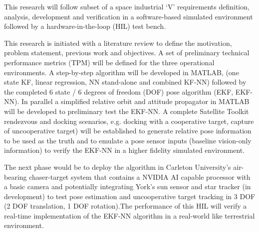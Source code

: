 This research will follow subset of a space industrial ‘V’ requirements definition, analysis, development and verification in a software-based simulated environment followed by a hardware-in-the-loop (HIL) test bench. 

This research is initiated with a literature review to define the motivation, problem statement, previous work and objectives. A set of preliminary technical performance metrics (TPM) will be defined for the three operational environments. A step-by-step  algorithm will be developed in MATLAB, (one state KF, linear regression, NN stand-alone and combined KF-NN) followed by the completed 6  state / 6 degrees of freedom (DOF) pose algorithm (EKF, EKF-NN). In parallel a simplified relative orbit and attitude propagator in MATLAB will be developed to preliminary test the EKF-NN. A complete Satellite Toolkit rendezvous and docking scenarios, e.g. docking with a cooperative target, capture of uncooperative target) will be established to generate relative pose information to be used as the truth and to emulate a pose sensor inputs (baseline  vision-only information) to verify the EKF-NN in a higher fidelity simulated environment. 

The next phase would be to deploy the algorithm in Carleton University’s air-bearing chaser-target system that contains a NVIDIA AI capable processor with a basic camera and potentially integrating York’s sun sensor and star tracker (in development) to test pose estimation and uncooperative target tracking in 3 DOF (2 DOF translation, 1 DOF rotation).The performance of this HIL will verify a real-time implementation of the EKF-NN algorithm in a real-world like terrestrial environment.

